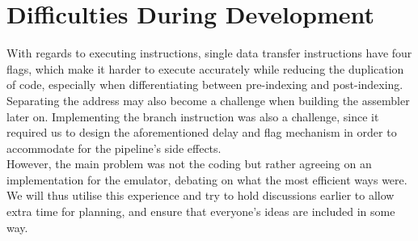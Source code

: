\documentclass[11pt]{article}
\begin{document}
\section{Difficulties During Development}

With regards to executing instructions, single data transfer instructions have four flags, which make it harder to execute accurately while reducing the duplication of code, especially when differentiating between pre-indexing and post-indexing. Separating the address may also become a challenge when building the assembler later on. Implementing the branch instruction was also a challenge, since it required us to design the aforementioned delay and flag mechanism in order to accommodate for the pipeline's side effects.\\

However, the main problem was not the coding but rather agreeing on an implementation for the emulator, debating on what the most efficient ways were. We will thus utilise this experience and try to hold discussions earlier to allow extra time for planning, and ensure that everyone’s ideas are included in some way.
\end{document}
